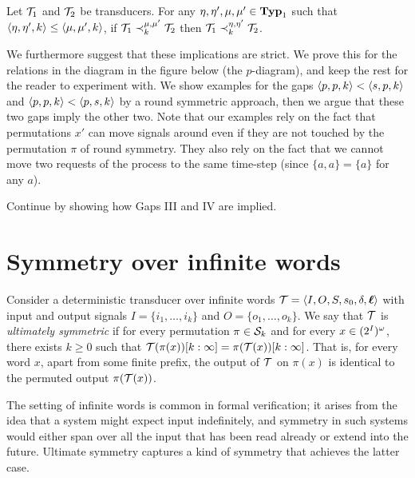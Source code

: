 \begin{lemma}
        Let $\mathcal{T}_1$ and $\mathcal{T}_2$ be transducers. For any $\eta,\eta',\mu,\mu'\in\mathbf{Typ}_1$ such that $\left< \eta,\eta',k\right>\leq \left< \mu,\mu',k\right>$, if $\mathcal{T}_1 \prec_{k}^{\mu,\mu'} \mathcal{T}_2$ then $\mathcal{T}_1 \prec_{k}^{\eta,\eta'} \mathcal{T}_2$.
\end{lemma}

We furthermore suggest that these implications are strict. We prove this for the relations in the diagram in the figure below (the $p$-diagram), and keep the rest for the reader to experiment with. We show examples for the gaps $\left< p, p, k\right><\left< s, p, k\right>$ and $\left< p, p, k\right><\left< p, s, k\right>$ by a round symmetric approach, then we argue that these two gaps imply the other two.
Note that our examples rely on the fact that permutations $x'$ can move signals around even if they are not touched by the permutation $\pi$ of round symmetry. They also rely on the fact that we cannot move two requests of the process to the same time-step (since $\{a,a\}=\{a\}$ for any $a$).

\begin{example}[Gap I]
\end{example}

\begin{example}[Gap II]
\end{example}

Continue by showing how Gaps III and IV are implied.

\section{Symmetry over infinite words}

Consider a deterministic transducer over infinite words $\mathcal{T}=\left< I,O,S,s_0,\delta,\boldsymbol{\ell}\right>$ with input and output signals $I=\{i_1,\ldots,i_k\}$ and $O=\{o_1,\ldots,o_k\}$. We say that $\mathcal{T}$ is \emph{ultimately symmetric} if for every permutation $\pi\in \mathcal{S}_k$ and for every $x\in (2^{I})^\omega$, there exists $k\ge 0$ such that $\mathcal{T}(\pi(x))[k:\infty]=\pi(\mathcal{T}(x))[k:\infty]$. That is, for every word $x$, apart from some finite prefix, the output of $\mathcal{T}$ on $\pi(x)$ is identical to the permuted output $\pi(\mathcal{T}(x))$.

The setting of infinite words is common in formal verification; it arises from the idea that a system might expect input indefinitely, and symmetry in such systems would either span over all the input that has been read already or extend into the future. Ultimate symmetry captures a kind of symmetry that achieves the latter case.

